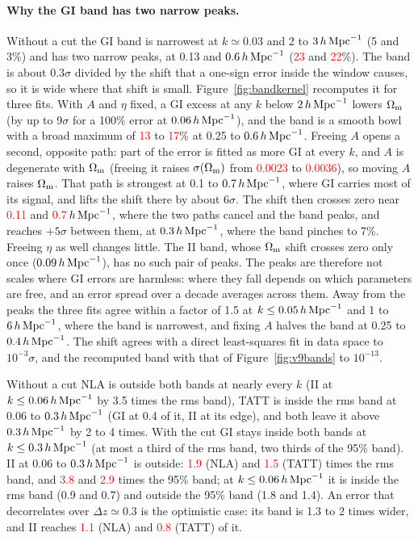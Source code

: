 \documentclass[11pt]{article}
\newcommand{\hMpc}{\,h\,{\rm Mpc}^{-1}}
\newcommand{\Om}{\Omega_{\rm m}}
\newif\ifnumbersfinal
\newcommand{\refresh}[1]{\ifnumbersfinal#1\else\textcolor{red}{#1}\fi}
\newcommand{\NineNLAII}{\refresh{1.9}}
\newcommand{\NineTATTII}{\refresh{1.5}}
\newcommand{\NineNLAIIn}{\refresh{3.8}}
\newcommand{\NineTATTIIn}{\refresh{2.9}}
\newcommand{\NineNLAIIopt}{\refresh{1.1}}
\newcommand{\NineTATTIIopt}{\refresh{0.8}}
\newcommand{\NineKerPeakLo}{\refresh{23}}
\newcommand{\NineKerPeakHi}{\refresh{22}}
\newcommand{\NineKerSigFix}{\refresh{0.0023}}
\newcommand{\NineKerSigFree}{\refresh{0.0036}}
\newcommand{\NineKerCrossLo}{\refresh{0.11}}
\newcommand{\NineKerCrossHi}{\refresh{0.7}}
\newcommand{\NineKerFixLo}{\refresh{13}}
\newcommand{\NineKerFixHi}{\refresh{17}}
\newcommand{\Tol}{0.3}
\begin{document}
\paragraph{Why the GI band has two narrow peaks.}
Without a cut the GI band is narrowest at $k \simeq 0.03$ and 2 to
$3\hMpc$ (5 and 3\%) and has two narrow peaks, at 0.13 and $0.6\hMpc$
(\NineKerPeakLo{} and \NineKerPeakHi\%). The band is about \Tol$\sigma$
divided by the shift that a one-sign error inside the window causes, so it
is wide where that shift is small. Figure~\ref{fig:bandkernel} recomputes
it for three fits. With $A$ and $\eta$ fixed, a GI excess at any $k$ below
$2\hMpc$ lowers $\Om$ (by up to 9$\sigma$ for a 100\% error at
$0.06\hMpc$), and the band is a smooth bowl with a broad maximum of
\NineKerFixLo{} to \NineKerFixHi\% at 0.25 to $0.6\hMpc$. Freeing $A$
opens a second, opposite path: part of the error is fitted as more GI at
every $k$, and $A$ is degenerate with $\Om$ (freeing it raises
$\sigma(\Om)$ from \NineKerSigFix{} to \NineKerSigFree), so moving $A$
raises $\Om$. That path is strongest at 0.1 to $0.7\hMpc$, where GI
carries most of its signal, and lifts the shift there by about 6$\sigma$.
The shift then crosses zero near \NineKerCrossLo{} and
\NineKerCrossHi$\hMpc$, where the two paths cancel and the band peaks, and
reaches $+5\sigma$ between them, at $0.3\hMpc$, where the band pinches to
7\%. Freeing $\eta$ as well changes little. The II band, whose $\Om$ shift
crosses zero only once ($0.09\hMpc$), has no such pair of peaks. The peaks
are therefore not scales where GI errors are harmless: where they fall
depends on which parameters are free, and an error spread over a decade
averages across them. Away from the peaks the three fits agree within a
factor of 1.5 at $k \le 0.05\hMpc$ and 1 to $6\hMpc$, where the band is
narrowest, and fixing $A$ halves the band at 0.25 to $0.4\hMpc$. The shift
agrees with a direct least-squares fit in data space to $10^{-3}\sigma$,
and the recomputed band with that of Figure~\ref{fig:v9bands} to
$10^{-13}$.

Without a cut NLA is outside both bands at nearly every $k$ (II at $k \le
0.06\hMpc$ by 3.5 times the rms band), TATT is inside the rms band at 0.06
to $0.3\hMpc$ (GI at 0.4 of it, II at its edge), and both leave it above
$0.3\hMpc$ by 2 to 4 times. With the
cut GI stays inside both bands at $k \le 0.3\hMpc$ (at most a third of the
rms band, two thirds of the 95\% band). II at 0.06 to $0.3\hMpc$ is outside:
\NineNLAII{} (NLA) and \NineTATTII{} (TATT) times the rms band, and
\NineNLAIIn{} and \NineTATTIIn{} times the 95\% band; at $k \le
0.06\hMpc$ it is inside the rms band (0.9 and 0.7) and outside the 95\% band
(1.8 and 1.4). An error that decorrelates over $\Delta z \simeq 0.3$ is
the optimistic case: its band is 1.3 to 2 times wider, and II reaches
\NineNLAIIopt{} (NLA) and \NineTATTIIopt{} (TATT) of it.
\end{document}
